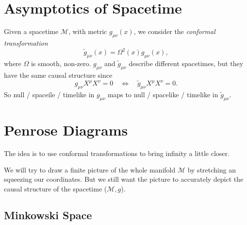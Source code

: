 
\section{Asymptotics of Spacetime}%
\label{sec:asymptotics_of_spacetime}

Given a spacetime $\mathcal{M}$, with metric $g_{\mu\nu}(x)$, we consider the \emph{conformal transformation}
\begin{equation}
  \widetilde{g}_{\mu\nu}(x) = \Omega^2 (x) g_{\mu\nu}(x),
\end{equation}
where $\Omega$ is smooth, non-zero.
$g_{\mu\nu}$ and $\widetilde{g}_{\mu\nu}$ describe different spacetimes, but they have the same causal structure since
\begin{equation}
  g_{\mu\nu} X^{\mu} X^{\nu} = 0 \quad \iff \quad \widetilde{g}_{\mu\nu} X^{\mu} X^{\nu} = 0.
\end{equation}
So null / spaceile / timelike in $g_{\mu\nu}$ maps to null / spacelike / timelike in $\widetilde{g}_{\mu\nu}$.

\section{Penrose Diagrams}%
\label{sec:penrose_diagrams}

The idea is to use conformal transformations to bring infinity a little closer.
\begin{leftbar}
  \begin{note}
    We will try to draw a finite picture of the whole manifold $\mathcal{M}$ by stretching an squeezing our coordinates. But we still want the picture to accurately depict the causal structure of the spacetime ($\mathcal{M}, g$).
  \end{note}
\end{leftbar}

\subsection{Minkowski Space}%
\label{sub:minkowski_space}


